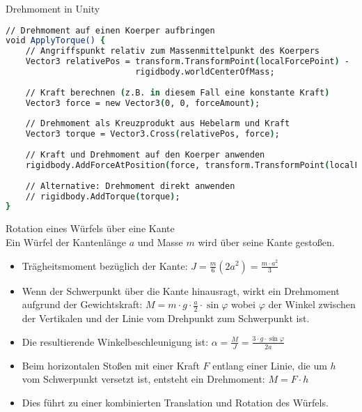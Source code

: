 \begin{examplecode}{Drehmoment in Unity}\\
    \begin{lstlisting}[language=csh, style=basesmol]
// Drehmoment auf einen Koerper aufbringen
void ApplyTorque() {
    // Angriffspunkt relativ zum Massenmittelpunkt des Koerpers
    Vector3 relativePos = transform.TransformPoint(localForcePoint) - 
                          rigidbody.worldCenterOfMass;
    
    // Kraft berechnen (z.B. in diesem Fall eine konstante Kraft)
    Vector3 force = new Vector3(0, 0, forceAmount);
    
    // Drehmoment als Kreuzprodukt aus Hebelarm und Kraft
    Vector3 torque = Vector3.Cross(relativePos, force);
    
    // Kraft und Drehmoment auf den Koerper anwenden
    rigidbody.AddForceAtPosition(force, transform.TransformPoint(localForcePoint));
    
    // Alternative: Drehmoment direkt anwenden
    // rigidbody.AddTorque(torque);
}
    \end{lstlisting}
\end{examplecode}

\begin{example2}{Rotation eines Würfels über eine Kante}\\
    Ein Würfel der Kantenlänge $a$ und Masse $m$ wird über seine Kante gestoßen.
    
    \begin{itemize}
        \item Trägheitsmoment bezüglich der Kante: $J = \frac{m}{6}(2a^2) = \frac{m \cdot a^2}{3}$
        
        \item Wenn der Schwerpunkt über die Kante hinausragt, wirkt ein Drehmoment aufgrund der Gewichtskraft:
        $M = m \cdot g \cdot \frac{a}{2} \cdot \sin\varphi$
        wobei $\varphi$ der Winkel zwischen der Vertikalen und der Linie vom Drehpunkt zum Schwerpunkt ist.
        
        \item Die resultierende Winkelbeschleunigung ist:
        $\alpha = \frac{M}{J} = \frac{3 \cdot g \cdot \sin\varphi}{2a}$
        
        \item Beim horizontalen Stoßen mit einer Kraft $F$ entlang einer Linie, die um $h$ vom Schwerpunkt versetzt ist, entsteht ein Drehmoment:
        $M = F \cdot h$
        
        \item Dies führt zu einer kombinierten Translation und Rotation des Würfels.
    \end{itemize}
\end{example2}

